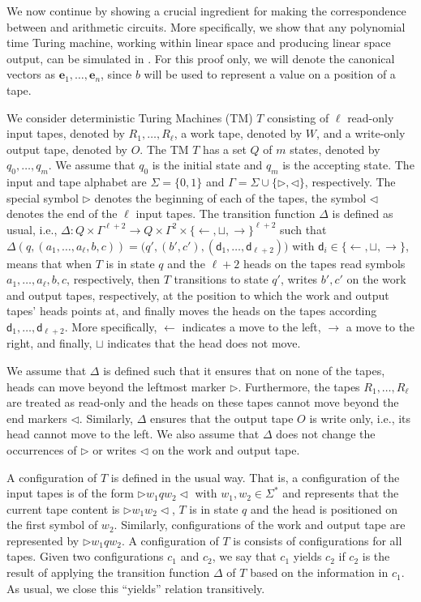 We now continue by showing a crucial ingredient for making the correspondence between \langfor
and arithmetic circuits. More specifically, 
we show that any polynomial time Turing machine, working within linear space and producing linear space output, can be simulated in \langfor. 
For this proof only, we will denote the canonical vectors as
$\mathbf{e}_1, \ldots, \mathbf{e}_n$, since $b$ will be used to represent a value on a position of a tape.

We consider  deterministic Turing Machines (TM) $T$ consisting of $\ell$ read-only input tapes, 
denoted by $R_1,\ldots,R_\ell$,
a work tape, denoted by $W$, and a write-only output tape, denoted by $O$. The TM $T$ has a set $Q$ of $m$
states, denoted by $q_0,\ldots,q_m$. We assume that $q_0$ is the initial state and $q_m$ is the accepting state.
The input and tape alphabet are $\Sigma=\{0,1\}$ and $\Gamma=\Sigma\cup\{\rhd,\lhd\}$, respectively. The special 
symbol $\rhd$ denotes the beginning of each of the tapes, the symbol $\lhd$ denotes the end of the $\ell$ input tapes. 
The transition function $\Delta$ is defined as usual, i.e., 
$\Delta:Q\times \Gamma^{\ell+2} \to Q\times \Gamma^{2}\times \{\leftarrow,\sqcup,\rightarrow\}^{\ell+2}$ 
such that $\Delta(q,(a_1,\ldots,a_{\ell},b,c))=\bigl(q',(b',c'),(\mathsf{d}_1,\ldots,\mathsf{d}_{\ell+2})\bigr)$
with $\mathsf{d}_i\in \{\leftarrow,\sqcup,\rightarrow\}$, means that when $T$ is in state $q$ and the $\ell+2$ 
heads on the tapes read symbols $a_1,\ldots,a_{\ell},b,c$, respectively, then $T$ transitions to state $q'$,
writes $b',c'$ on the work and output tapes, respectively, at the position to which the work and output 
tapes' heads points at, and finally moves the heads on the tapes according 
$\mathsf{d}_1,\ldots,\mathsf{d}_{\ell+2}$. More specifically, $\leftarrow$  indicates a move to the left, 
$\rightarrow$ a move to the right, and finally, $\sqcup$ indicates that the head does not move.

We assume that $\Delta$ is defined such that it ensures that on none of the tapes, heads can move beyond 
the leftmost marker $\rhd$. Furthermore, the tapes $R_1,\ldots,R_\ell$ are treated as read-only and the heads 
on these tapes cannot move beyond the end markers $\lhd$. Similarly, $\Delta$ ensures that the output tape $O$ 
is write only, i.e., its head cannot move to the left.  We also assume that $\Delta$ does not change the 
occurrences of $\rhd$ or writes $\lhd$ on the work and output tape.

A configuration of $T$ is defined in the usual way. That is, a configuration of the input tapes is of the form
$\rhd w_1qw_2\lhd$ with $w_1,w_2\in\Sigma^*$ and represents that the current tape content is 
$\rhd w_1w_2\lhd$, $T$ is in state $q$ and the head is positioned on the first symbol of $w_2$. 
Similarly, configurations of the work and output tape are represented by $\rhd w_1qw_2$. 
A configuration of $T$ is consists of configurations for all tapes. Given two configurations 
$c_1$ and $c_2$, we say that $c_1$ yields $c_2$ if $c_2$ is the result of applying the transition 
function $\Delta$ of $T$ based on the information in $c_1$. As usual, we close this ``yields'' relation 
transitively.

